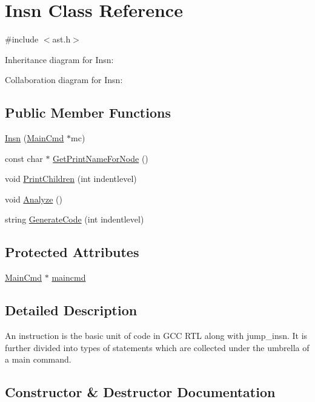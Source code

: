 \hypertarget{class_insn}{}\section{Insn Class Reference}
\label{class_insn}


{\ttfamily \#include $<$ast.\+h$>$}



Inheritance diagram for Insn\+:


Collaboration diagram for Insn\+:
\subsection*{Public Member Functions}
\begin{DoxyCompactItemize}
\item 
\hyperlink{class_insn_ab28b61272c44b3e5df0e59308cd1b139}{Insn} (\hyperlink{class_main_cmd}{Main\+Cmd} $\ast$mc)
\item 
const char $\ast$ \hyperlink{class_insn_ac78de59dd99944d8697853dc1c5634dc}{Get\+Print\+Name\+For\+Node} ()
\item 
void \hyperlink{class_insn_aa0717beb7970d93fa733ffa41b7629ac}{Print\+Children} (int indentlevel)
\item 
void \hyperlink{class_insn_a1e175152ea14cde985c5176e5a226f3d}{Analyze} ()
\item 
string \hyperlink{class_insn_a0bbea68b179d943f1a87aeb6c1b15dac}{Generate\+Code} (int indentlevel)
\end{DoxyCompactItemize}
\subsection*{Protected Attributes}
\begin{DoxyCompactItemize}
\item 
\hyperlink{class_main_cmd}{Main\+Cmd} $\ast$ \hyperlink{class_insn_ab5605fe6decf9aa5a49aaa4b4674861a}{maincmd}
\end{DoxyCompactItemize}


\subsection{Detailed Description}
An instruction is the basic unit of code in G\+CC R\+TL along with jump\+\_\+insn. It is further divided into types of statements which are collected under the umbrella of a main command. 

\subsection{Constructor \& Destructor Documentation}
\mbox{\label{class_insn_ab28b61272c44b3e5df0e59308cd1b139}} 

